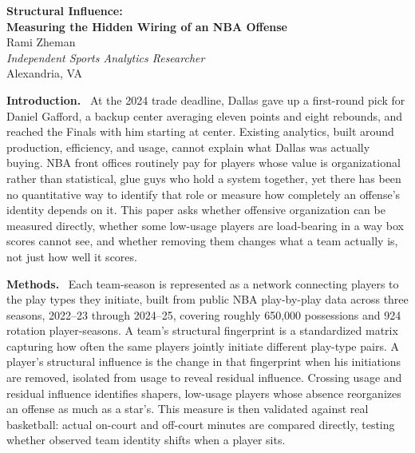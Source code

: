\documentclass[11pt,letterpaper]{article}
\newcommand{\abssection}[1]{\textbf{#1.}~}
\begin{document}
\begin{center}
{\LARGE\bfseries Structural Influence:}\\[0.35em]
{\large\bfseries Measuring the Hidden Wiring of an NBA Offense}\\[1em]
{\large Rami Zheman}\\[0.25em]
{\normalsize\textit{Independent Sports Analytics Researcher}\\
Alexandria, VA}
\end{center}

\vspace{0.6em}

\abssection{Introduction}
At the 2024 trade deadline, Dallas gave up a first-round pick for
Daniel Gafford, a backup center averaging eleven points and eight
rebounds, and reached the Finals with him starting at center.
Existing analytics, built around production, efficiency, and usage,
cannot explain what Dallas was actually buying. NBA front offices
routinely pay for players whose value is organizational rather than
statistical, glue guys who hold a system together, yet there has been
no quantitative way to identify that role or measure how completely
an offense's identity depends on it. This paper asks whether
offensive organization can be measured directly, whether some
low-usage players are load-bearing in a way box scores cannot see,
and whether removing them changes what a team actually is, not just
how well it scores.

\abssection{Methods}
Each team-season is represented as a network connecting players to
the play types they initiate, built from public NBA play-by-play data
across three seasons, 2022--23 through 2024--25, covering roughly
650{,}000 possessions and 924 rotation player-seasons. A team's
structural fingerprint is a standardized matrix capturing how often
the same players jointly initiate different play-type pairs. A
player's structural influence is the change in that fingerprint when
his initiations are removed, isolated from usage to reveal residual
influence. Crossing usage and residual influence identifies shapers,
low-usage players whose absence reorganizes an offense as much as a
star's. This measure is then validated against real basketball:
actual on-court and off-court minutes are compared directly, testing
whether observed team identity shifts when a player sits.
\end{document}
